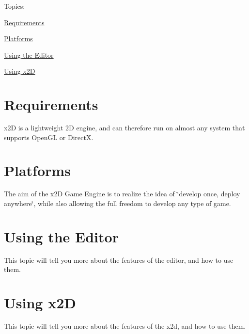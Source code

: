 Topics\-:
\begin{DoxyItemize}
\item \hyperlink{require}{Requirements}
\item \hyperlink{platforms}{Platforms}
\item \hyperlink{using_editor}{Using the Editor}
\item \hyperlink{using_x2d}{Using x2\-D} 
\end{DoxyItemize}\hypertarget{require}{}\section{Requirements}\label{require}
x2\-D is a lightweight 2\-D engine, and can therefore run on almost any system that supports Open\-G\-L or Direct\-X. \hypertarget{platforms}{}\section{Platforms}\label{platforms}
The aim of the x2\-D Game Engine is to realize the idea of \char`\"{}develop once, deploy anywhere\char`\"{}, while also allowing the full freedom to develop any type of game. \hypertarget{using_editor}{}\section{Using the Editor}\label{using_editor}
This topic will tell you more about the features of the editor, and how to use them. \hypertarget{using_x2d}{}\section{Using x2\-D}\label{using_x2d}
This topic will tell you more about the features of the x2d, and how to use them. 